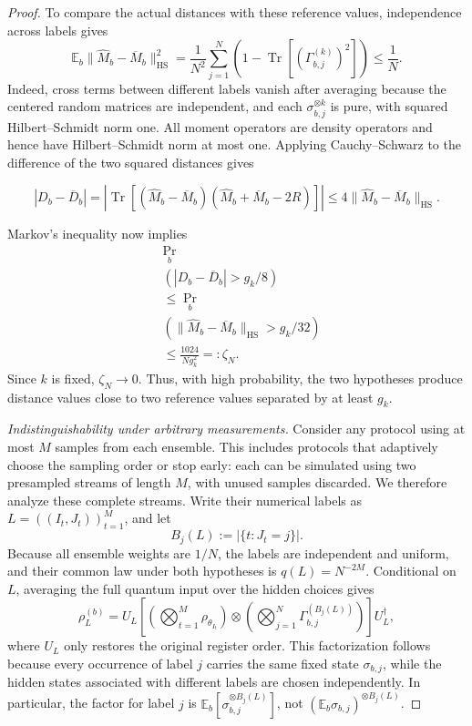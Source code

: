 \documentclass[aps,prx,reprint,superscriptaddress,amsmath,amssymb,longbibliography,floatfix]{revtex4-2}
\theoremstyle{plain}
\theoremstyle{definition}
\theoremstyle{remark}
\begin{document}
\begin{proof}
To compare the actual distances with these reference values, independence across labels gives
\[
\mathbb E_b\|\widehat M_b-\overline M_b\|_{\mathrm{HS}}^2=\frac1{N^2}\sum_{j=1}^N\left(1-\operatorname{Tr}[(\Gamma_{b,j}^{(k)})^2]\right)\le\frac1N.
\]
Indeed, cross terms between different labels vanish after averaging because the centered random matrices are independent, and each $\sigma_{b,j}^{\otimes k}$ is pure, with squared Hilbert--Schmidt norm one. All moment operators are density operators and hence have Hilbert--Schmidt norm at most one. Applying Cauchy--Schwarz to the difference of the two squared distances gives
\begin{widetext}
\[
|D_b-\overline D_b|=\left|\operatorname{Tr}[(\widehat M_b-\overline M_b)(\widehat M_b+\overline M_b-2R)]\right|\le4\|\widehat M_b-\overline M_b\|_{\mathrm{HS}}.
\]
\end{widetext}
Markov's inequality now implies
\begin{equation}
\begin{aligned}
&\Pr_b\!\\
&\left(|D_b-\overline D_b|>g_k/8\right)\\
&\le\Pr_b\!\\
&\left(\|\widehat M_b-\overline M_b\|_{\mathrm{HS}}>g_k/32\right)\\
&\le\frac{1024}{Ng_k^2}=:\zeta_N.
\end{aligned}
\label{eq:app-mmd-lower-distance-concentration}
\end{equation}
Since $k$ is fixed, $\zeta_N\to0$. Thus, with high probability, the two hypotheses produce distance values close to two reference values separated by at least $g_k$.

\emph{Indistinguishability under arbitrary measurements.} Consider any protocol using at most $M$ samples from each ensemble. This includes protocols that adaptively choose the sampling order or stop early: each can be simulated using two presampled streams of length $M$, with unused samples discarded. We therefore analyze these complete streams. Write their numerical labels as $L=((I_t,J_t))_{t=1}^M$, and let
\[
B_j(L):=|\{t:J_t=j\}|.
\]
Because all ensemble weights are $1/N$, the labels are independent and uniform, and their common law under both hypotheses is $q(L)=N^{-2M}$. Conditional on $L$, averaging the full quantum input over the hidden choices gives
\begin{equation}
\rho_L^{(b)}=U_L\left[\left(\bigotimes_{t=1}^M\rho_{\theta_{I_t}}\right)\otimes\left(\bigotimes_{j=1}^N\Gamma_{b,j}^{(B_j(L))}\right)\right]U_L^\dagger,
\label{eq:app-mmd-lower-conditional-input}
\end{equation}
where $U_L$ only restores the original register order. This factorization follows because every occurrence of label $j$ carries the same fixed state $\sigma_{b,j}$, while the hidden states associated with different labels are chosen independently. In particular, the factor for label $j$ is $\mathbb E_b[\sigma_{b,j}^{\otimes B_j(L)}]$, not $(\mathbb E_b\sigma_{b,j})^{\otimes B_j(L)}$.


\end{proof}
\end{document}
